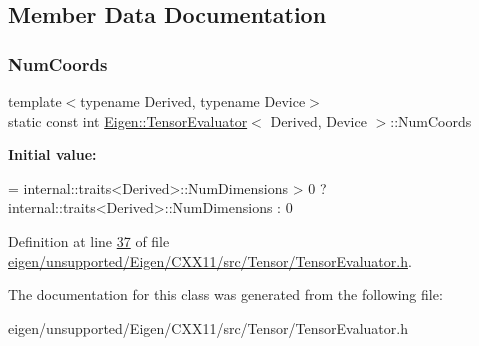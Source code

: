 \subsection{Member Data Documentation}
\mbox{\label{struct_eigen_1_1_tensor_evaluator_a30cd3b60b28b38ee159bf5ed13f51fd6}} 
\subsubsection{\texorpdfstring{Num\+Coords}{NumCoords}}
{\footnotesize\ttfamily template$<$typename Derived, typename Device$>$ \\
static const int \hyperlink{struct_eigen_1_1_tensor_evaluator}{Eigen\+::\+Tensor\+Evaluator}$<$ Derived, Device $>$\+::Num\+Coords\hspace{0.3cm}{\ttfamily [static]}}

{\bfseries Initial value\+:}
\begin{DoxyCode}
= internal::traits<Derived>::NumDimensions > 0 ?
                               internal::traits<Derived>::NumDimensions : 0
\end{DoxyCode}


Definition at line \hyperlink{eigen_2unsupported_2_eigen_2_c_x_x11_2src_2_tensor_2_tensor_evaluator_8h_source_l00037}{37} of file \hyperlink{eigen_2unsupported_2_eigen_2_c_x_x11_2src_2_tensor_2_tensor_evaluator_8h_source}{eigen/unsupported/\+Eigen/\+C\+X\+X11/src/\+Tensor/\+Tensor\+Evaluator.\+h}.



The documentation for this class was generated from the following file\+:\begin{DoxyCompactItemize}
\item 
eigen/unsupported/\+Eigen/\+C\+X\+X11/src/\+Tensor/\+Tensor\+Evaluator.\+h\end{DoxyCompactItemize}
